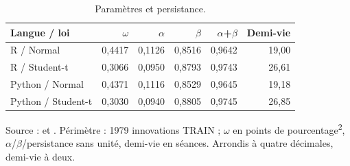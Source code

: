 \begin{table}[!htbp]
\centering
\caption{Paramètres et persistance.}
\label{tab:garch}
\small
\setlength{\tabcolsep}{4pt}
\renewcommand{\arraystretch}{1.16}
\begin{tabularx}{\linewidth}{Xrrrrr}
\toprule
\textbf{Langue / loi} & \textbf{\(\omega\)} & \textbf{\(\alpha\)} & \textbf{\(\beta\)} & \textbf{\(\alpha\)+\(\beta\)} & \textbf{Demi-vie} \\
\midrule
R / Normal & 0,4417 & 0,1126 & 0,8516 & 0,9642 & 19,00 \\
R / Student-t & 0,3066 & 0,0950 & 0,8793 & 0,9743 & 26,61 \\
Python / Normal & 0,4371 & 0,1116 & 0,8529 & 0,9645 & 19,18 \\
Python / Student-t & 0,3030 & 0,0940 & 0,8805 & 0,9745 & 26,85 \\
\bottomrule
\end{tabularx}
\par\smallskip
\begin{minipage}{\linewidth}\footnotesize Source :  et . Périmètre : 1979 innovations TRAIN ; \(\omega\) en points de pourcentage\textsuperscript{2}, \(\alpha\)/\(\beta\)/persistance sans unité, demi-vie en séances. Arrondis à quatre décimales, demi-vie à deux.
\end{minipage}
\end{table}
